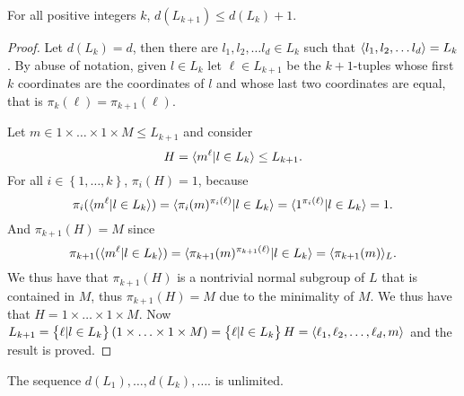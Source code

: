 \begin{theorem}
    \label{S2:bounddLk}
    For all positive integers $k$, $d(L_{k+1}) \le d(L_k) + 1$.    
\end{theorem}
\begin{proof}
    Let $d(L_k) = d$, then there are $l_1, l_2, \ldots  l_d \in L_k$ such that $\langle l_1, l_2, \ldots  l_d \rangle = L_k$. By abuse of notation, given $l \in L_k$ let $\ell \in L_{k+1}$ be the $k+1$-tuples whose first $k$ coordinates are the coordinates of $l$ and whose last two coordinates are equal, that is $\pi_k(\ell) = \pi_{k+1}(\ell)$. 
        
    Let $m \in 1 \times \ldots  \times 1 \times M \le L_{k+1}$ and consider
    $$H = \langle m^\ell | l \in L_k \rangle \le L_{k+1}.$$
    For all $i \in \left\{1, \ldots , k \right\}$, $\pi_i(H) = 1$, because
    $$\pi_i(\langle m^\ell | l \in L_k \rangle) = \langle \pi_i(m)^{\pi_i(\ell)} | l \in L_k \rangle = \langle 1^{\pi_i(\ell)} | l \in L_k \rangle = 1.$$ 
    And $\pi_{k+1}(H) = M$ since
    $$\pi_{k+1}(\langle m^\ell | l \in L_k \rangle) = \langle \pi_{k+1}(m)^{\pi_{k+1}(\ell)} | l \in L_k \rangle = \langle \pi_{k+1}(m) \rangle_L.$$
    We thus have that $\pi_{k+1}(H)$ is a nontrivial normal subgroup of $L$ that is contained in $M$, thus $\pi_{k+1}(H) = M$ due to the minimality of $M$. We thus have that $H = 1 \times \ldots  \times 1 \times M$.
    Now $L_{k+1} = \left\{ \ell | l \in L_{k} \right\}(1 \times \ldots  \times 1 \times M) = \left\{ \ell | l \in L_{k} \right\} H = \langle \ell_1, \ell_2, \ldots  , \ell_d, m \rangle$
    and the result is proved.
    
\end{proof}

\begin{theorem}
    \label{S2:undLk}
    The sequence $d(L_1),\ldots ,d(L_k), \ldots .$ is unlimited.
\end{theorem}

